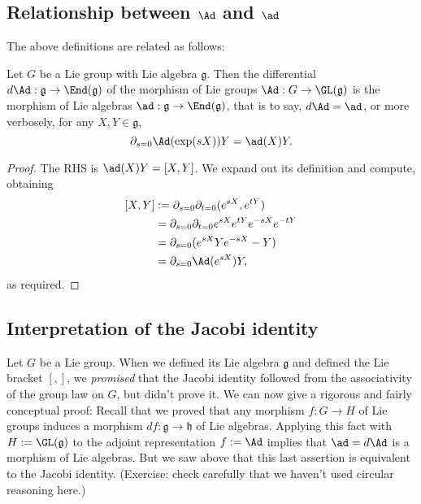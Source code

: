 \documentclass[reqno]{amsart} 
\begin{document}
\subsection{Relationship between \texorpdfstring{$\Ad$}{Ad} and \texorpdfstring{$\ad$}{ad}}
\label{sec:orgeaeefa5}
The above definitions are related as follows:
\begin{lemma}\label{lem:dAd-is-ad}
  Let $G$ be a Lie group with Lie algebra $\mathfrak{g}$.
  Then the differential $d \Ad : \mathfrak{g}
  \rightarrow \End(\mathfrak{g})$
  of the morphism of Lie groups
  $\Ad : G \rightarrow \GL(\mathfrak{g})$
  is the morphism of Lie algebras
  $\ad : \mathfrak{g} \rightarrow \End(\mathfrak{g})$,
  that is to say, $d \Ad = \ad$,
  or more verbosely,
  for any $X ,Y \in \mathfrak{g}$,
  \begin{equation*}
    \partial_{s=0}
    \Ad(\exp(s X)) Y = \ad(X) Y.
  \end{equation*}
\end{lemma}
\begin{proof}
  The RHS is $\ad(X) Y = [X,Y]$.
  We expand out its definition and compute,
  obtaining
  \begin{align*}
    {}    [X,Y]
    &:=
      \partial_{s=0} \partial_{t=0} (e^{s X}, e^{t Y})
      \\
    &=
      \partial_{s=0} \partial_{t=0}  e^{s X} e^{t Y} e^{-s X} e^{-t Y}
      \\
    &=
      \partial_{s=0} (e^{s X} Y e^{-s X}  - Y )
      \\
    &=
      \partial_{s=0} \Ad(e^{s X}) Y,
  \end{align*}
  as required.
\end{proof}

\subsection{Interpretation of the Jacobi identity}
\label{sec:orgeedd74d}
\begin{remark}
  Let $G$ be a Lie group.
  When we defined its Lie algebra $\mathfrak{g}$
  and defined the Lie bracket $[,]$,
  we \emph{promised} that the Jacobi identity
  followed from the associativity of the group law on $G$,
  but didn't prove it.
  We can now give a rigorous and fairly conceptual proof:
  Recall that we proved
  that any morphism $f : G \rightarrow H$
  of Lie groups
  induces a morphism $d f : \mathfrak{g} \rightarrow
  \mathfrak{h}$ of Lie algebras.
  Applying this fact with $H := \GL(\mathfrak{g})$
  to the adjoint representation $f := \Ad$
  implies that $\ad = d \Ad$ is a morphism of Lie algebras.
  But we saw above that this last assertion is equivalent
  to the Jacobi identity.
  (Exercise: check carefully that we haven't used circular reasoning here.)
\end{remark}
\end{document}
